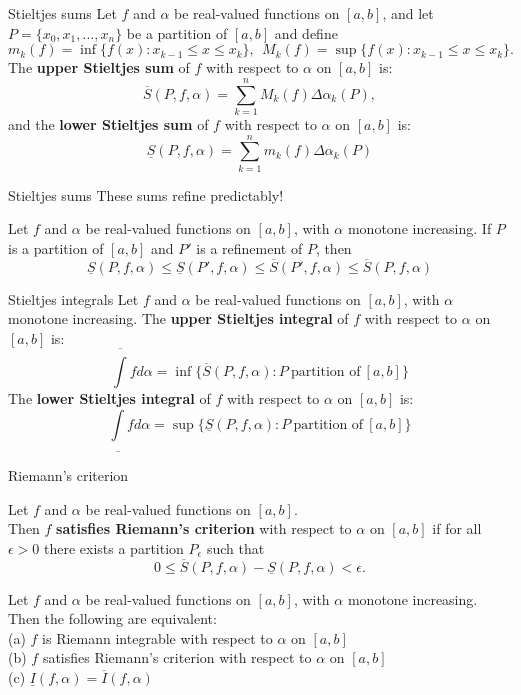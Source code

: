 \documentclass{beamer}
\begin{document}
\begin{frame}{Stieltjes sums}
Let $f$ and $\alpha$ be real-valued functions on $[a,b]$, and let $P=\{x_0,x_1,\dots,x_n\}$ be a partition of $[a,b]$ and define\\
{\small
$$m_k(f) = \inf\{f(x): x_{k-1}\leq x\leq x_k\},\ \ M_k(f) = \sup\{f(x): x_{k-1}\leq x\leq x_k\}.$$
}
\pause
The \textbf{upper Stieltjes sum} of $f$ with respect to $\alpha$ on $[a,b]$ is:
$$\overline{S}(P,f,\alpha) = \sum_{k=1}^n M_k(f)\Delta\alpha_k(P),$$
\pause
and the \textbf{lower Stieltjes sum} of $f$ with respect to $\alpha$ on $[a,b]$ is:
$$\underline{S}(P,f,\alpha) = \sum_{k=1}^n m_k(f)\Delta\alpha_k(P)$$
\end{frame}

\begin{frame}{Stieltjes sums}
These sums refine predictably!
\begin{lem}
Let $f$ and $\alpha$ be real-valued functions on $[a,b]$, with $\alpha$ monotone increasing.
\pause
If $P$ is a partition of $[a,b]$ and $P'$ is a refinement of $P$, then
$$
\underline{S}(P,f,\alpha) \leq
\underline{S}(P',f,\alpha) \leq
\overline{S}(P',f,\alpha) \leq
\overline{S}(P,f,\alpha)
$$
\end{lem}
\end{frame}

\begin{frame}{Stieltjes integrals}
Let $f$ and $\alpha$ be real-valued functions on $[a,b]$, with $\alpha$ monotone increasing.
\pause
The \textbf{upper Stieltjes integral} of $f$ with respect to $\alpha$ on $[a,b]$ is:
$$\overline{\int} fd\alpha = \inf\{\overline{S}(P,f,\alpha): P\ \text{partition of}\ [a,b]\}$$
\pause
The \textbf{lower Stieltjes integral} of $f$ with respect to $\alpha$ on $[a,b]$ is:
$$\underline{\int} fd\alpha = \sup\{\underline{S}(P,f,\alpha): P\ \text{partition of}\ [a,b]\}$$
\end{frame}

\begin{frame}{Riemann's criterion}
\begin{defn}
Let $f$ and $\alpha$ be real-valued functions on $[a,b]$.\\
Then $f$ \textbf{satisfies Riemann's criterion} with respect to $\alpha$ on $[a,b]$ if for all $\epsilon > 0$ there exists a partition $P_\epsilon$ such that
$$0\leq \overline S(P,f,\alpha)-\underline S(P,f,\alpha) < \epsilon.$$
\end{defn}
\pause
\begin{thm}
Let $f$ and $\alpha$ be real-valued functions on $[a,b]$, with $\alpha$ monotone increasing.  Then the following are equivalent:\\
\pause
(a) $f$ is Riemann integrable with respect to $\alpha$ on $[a,b]$\\
\pause
(b) $f$ satisfies Riemann's criterion with respect to $\alpha$ on $[a,b]$\\
\pause
(c) $\underline I(f,\alpha) = \overline I(f,\alpha)$
\end{thm}
\end{frame}
\end{document}
